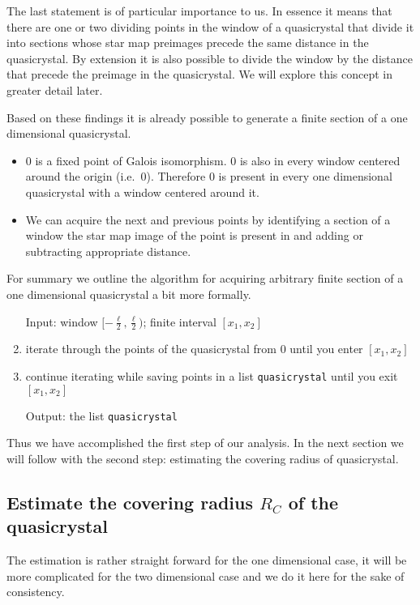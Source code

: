 \documentclass[text.tex]{subfiles}
\begin{document}
The last statement is of particular importance to us. In essence it means that there are one or two dividing points in the window of a quasicrystal that divide it into sections whose star map preimages precede the same distance in the quasicrystal. By extension it is also possible to divide the window by the distance that precede the preimage in the quasicrystal. We will explore this concept in greater detail later. 

Based on these findings it is already possible to generate a finite section of a one dimensional quasicrystal. 
\begin{itemize}
\item $0$ is a fixed point of Galois isomorphism. $0$ is also in every window centered around the origin (i.e.\ $0$). Therefore $0$ is present in every one dimensional quasicrystal with a window centered around it. 
\item We can acquire the next and previous points by identifying a section of a window the star map image of the point is present in and adding or subtracting appropriate distance. 
\end{itemize}

For summary we outline the algorithm for acquiring arbitrary finite section of a one dimensional quasicrystal a bit more formally. 

\begin{enumerate}
\item[Input:] window $[-\frac{\ell}{2},\frac{\ell}{2})$; finite interval $[x_1,x_2]$
\item iterate through the points of the quasicrystal from $0$ until you enter $[x_1,x_2]$
\item continue iterating while saving points in a list \texttt{quasicrystal} until you exit $[x_1,x_2]$
\item[Output:] the list \texttt{quasicrystal}
\end{enumerate}

Thus we have accomplished the first step of our analysis. In the next section we will follow with the second step: estimating the covering radius of quasicrystal. 

\subsection{Estimate the covering radius $R_C$ of the quasicrystal}
The estimation is rather straight forward for the one dimensional case, it will be more complicated for the two dimensional case and we do it here for the sake of consistency. 
\end{document}
